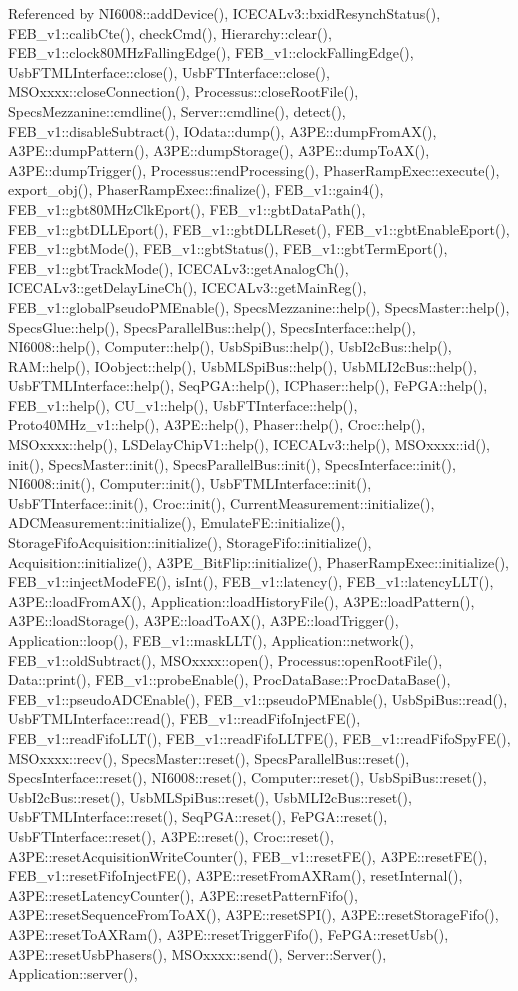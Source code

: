 Referenced by NI6008::addDevice(), ICECALv3::bxidResynchStatus(), FEB\_\-v1::calibCte(), checkCmd(), Hierarchy::clear(), FEB\_\-v1::clock80MHzFallingEdge(), FEB\_\-v1::clockFallingEdge(), UsbFTMLInterface::close(), UsbFTInterface::close(), MSOxxxx::closeConnection(), Processus::closeRootFile(), SpecsMezzanine::cmdline(), Server::cmdline(), detect(), FEB\_\-v1::disableSubtract(), IOdata::dump(), A3PE::dumpFromAX(), A3PE::dumpPattern(), A3PE::dumpStorage(), A3PE::dumpToAX(), A3PE::dumpTrigger(), Processus::endProcessing(), PhaserRampExec::execute(), export\_\-obj(), PhaserRampExec::finalize(), FEB\_\-v1::gain4(), FEB\_\-v1::gbt80MHzClkEport(), FEB\_\-v1::gbtDataPath(), FEB\_\-v1::gbtDLLEport(), FEB\_\-v1::gbtDLLReset(), FEB\_\-v1::gbtEnableEport(), FEB\_\-v1::gbtMode(), FEB\_\-v1::gbtStatus(), FEB\_\-v1::gbtTermEport(), FEB\_\-v1::gbtTrackMode(), ICECALv3::getAnalogCh(), ICECALv3::getDelayLineCh(), ICECALv3::getMainReg(), FEB\_\-v1::globalPseudoPMEnable(), SpecsMezzanine::help(), SpecsMaster::help(), SpecsGlue::help(), SpecsParallelBus::help(), SpecsInterface::help(), NI6008::help(), Computer::help(), UsbSpiBus::help(), UsbI2cBus::help(), RAM::help(), IOobject::help(), UsbMLSpiBus::help(), UsbMLI2cBus::help(), UsbFTMLInterface::help(), SeqPGA::help(), ICPhaser::help(), FePGA::help(), FEB\_\-v1::help(), CU\_\-v1::help(), UsbFTInterface::help(), Proto40MHz\_\-v1::help(), A3PE::help(), Phaser::help(), Croc::help(), MSOxxxx::help(), LSDelayChipV1::help(), ICECALv3::help(), MSOxxxx::id(), init(), SpecsMaster::init(), SpecsParallelBus::init(), SpecsInterface::init(), NI6008::init(), Computer::init(), UsbFTMLInterface::init(), UsbFTInterface::init(), Croc::init(), CurrentMeasurement::initialize(), ADCMeasurement::initialize(), EmulateFE::initialize(), StorageFifoAcquisition::initialize(), StorageFifo::initialize(), Acquisition::initialize(), A3PE\_\-BitFlip::initialize(), PhaserRampExec::initialize(), FEB\_\-v1::injectModeFE(), isInt(), FEB\_\-v1::latency(), FEB\_\-v1::latencyLLT(), A3PE::loadFromAX(), Application::loadHistoryFile(), A3PE::loadPattern(), A3PE::loadStorage(), A3PE::loadToAX(), A3PE::loadTrigger(), Application::loop(), FEB\_\-v1::maskLLT(), Application::network(), FEB\_\-v1::oldSubtract(), MSOxxxx::open(), Processus::openRootFile(), Data::print(), FEB\_\-v1::probeEnable(), ProcDataBase::ProcDataBase(), FEB\_\-v1::pseudoADCEnable(), FEB\_\-v1::pseudoPMEnable(), UsbSpiBus::read(), UsbFTMLInterface::read(), FEB\_\-v1::readFifoInjectFE(), FEB\_\-v1::readFifoLLT(), FEB\_\-v1::readFifoLLTFE(), FEB\_\-v1::readFifoSpyFE(), MSOxxxx::recv(), SpecsMaster::reset(), SpecsParallelBus::reset(), SpecsInterface::reset(), NI6008::reset(), Computer::reset(), UsbSpiBus::reset(), UsbI2cBus::reset(), UsbMLSpiBus::reset(), UsbMLI2cBus::reset(), UsbFTMLInterface::reset(), SeqPGA::reset(), FePGA::reset(), UsbFTInterface::reset(), A3PE::reset(), Croc::reset(), A3PE::resetAcquisitionWriteCounter(), FEB\_\-v1::resetFE(), A3PE::resetFE(), FEB\_\-v1::resetFifoInjectFE(), A3PE::resetFromAXRam(), resetInternal(), A3PE::resetLatencyCounter(), A3PE::resetPatternFifo(), A3PE::resetSequenceFromToAX(), A3PE::resetSPI(), A3PE::resetStorageFifo(), A3PE::resetToAXRam(), A3PE::resetTriggerFifo(), FePGA::resetUsb(), A3PE::resetUsbPhasers(), MSOxxxx::send(), Server::Server(), Application::server(), 